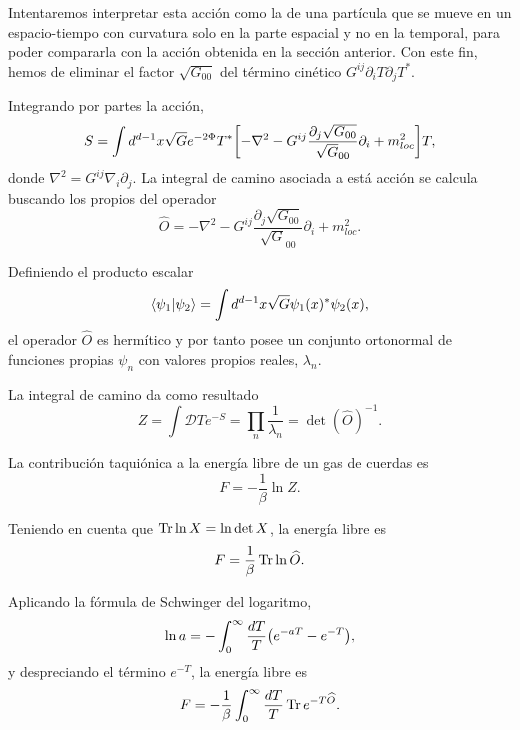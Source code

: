 Intentaremos interpretar esta acción como la de una partícula que se mueve en un espacio-tiempo con 
curvatura solo en la parte espacial y no en la temporal, para poder compararla con la acción obtenida
en la sección anterior.
Con este fin, hemos de eliminar el factor $\sqrt{G_{00}}$ del término cinético $G^{ij}\partial_i T \partial_j T^*$.

Integrando por partes la acción,
\begin{equation}
  S = \int d^{d-1} x \sqrt G e^{-2\Phi} T^* \qty[-\nabla^2-G^{ij}\frac{\partial_j \sqrt{G_{00}}}{\sqrt G_{00}}\partial_i + m^2_{loc}]T,
\end{equation}
donde $\nabla^2 = G^{ij}\nabla_i \partial_j$.
La integral de camino asociada a está acción se calcula buscando los
propios del operador 
\begin{equation}
  \widehat{O} =-\nabla^2-G^{ij}\frac{\partial_j \sqrt{G_{00}}}{\sqrt G_{00}}\partial_i + m^2_{loc}.
\end{equation}

Definiendo el producto escalar
\begin{equation}
  \braket{\psi_1}{\psi_2} = \int d^{d-1} x \sqrt G \psi_1(x)^* \psi_2(x),
\end{equation}
el operador $\widehat O$ es hermítico y por tanto posee un conjunto ortonormal de funciones
propias $\psi_n$ con valores propios reales, $\lambda_n$.

La integral de camino da como resultado
\begin{equation}
  Z=\int \mathcal D T e^{-S} =\prod_n \frac{1}{\lambda_n} = \det(\widehat O)^{-1}.
\end{equation}

La contribución taquiónica a la energía libre de un gas de cuerdas es
\begin{equation}
  F=-\frac{1}{\beta}\ln Z. 
\end{equation}

Teniendo en cuenta que $\Tr \ln X = \ln \det X$, la energía libre es
\begin{equation}
  F=\frac{1}{\beta} \Tr \ln \widehat O.
\end{equation}

Aplicando la fórmula de Schwinger del logaritmo, 
\begin{equation}
  \ln a = -\int_0^\infty \frac{dT}{T}\qty(e^{-aT}-e^{-T}),
\end{equation}
y despreciando el término $e^{-T}$, la energía libre es
\begin{equation}
  F=-\frac{1}{\beta}\int_0^\infty \frac{dT}{T} \Tr e^{-T\widehat O}.
  \label{eq:fO}
\end{equation}

